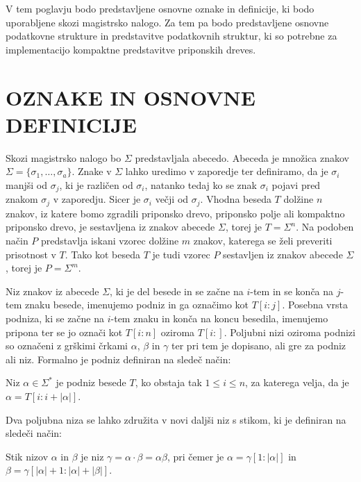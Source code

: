 
V tem poglavju bodo predstavljene osnovne oznake in definicije, ki bodo uporabljene skozi magistrsko nalogo. Za tem pa bodo predstavljene osnovne podatkovne strukture in predstavitve podatkovnih struktur, ki so potrebne za implementacijo kompaktne predstavitve priponskih dreves.


\section{OZNAKE IN OSNOVNE DEFINICIJE}\label{sec:def}
Skozi magistrsko nalogo bo $\Sigma$ predstavljala abecedo. Abeceda je množica znakov $\Sigma=\{\sigma_1,\dots,\sigma_a\}$. Znake v $\Sigma$ lahko uredimo v zaporedje ter definiramo, da je $\sigma_i$ manjši od $\sigma_j$, ki je različen od $\sigma_i$, natanko tedaj ko se znak $\sigma_i$ pojavi pred znakom $\sigma_j$ v zaporedju. Sicer je $\sigma_i$ večji od $\sigma_j$.
Vhodna beseda $T$ dolžine $n$ znakov, iz katere bomo zgradili priponsko drevo, priponsko polje ali kompaktno priponsko drevo, je sestavljena iz znakov abecede $\Sigma$, torej je $T=\Sigma^n$. Na podoben način $P$ predstavlja iskani vzorec dolžine $m$ znakov, katerega se želi preveriti prisotnost v $T$. Tako kot beseda $T$ je tudi vzorec $P$ sestavljen iz znakov abecede $\Sigma$, torej je $P=\Sigma^m$.

Niz znakov iz abecede $\Sigma$, ki je del besede in se začne na $i$-tem in se konča na $j$-tem znaku besede, imenujemo podniz in ga označimo kot $T[i:j]$. Posebna vrsta podniza, ki se začne na $i$-tem znaku in konča na koncu besedila, imenujemo pripona ter se jo označi kot $T[i:n]$ oziroma $T[i:]$. Poljubni nizi oziroma podnizi so označeni z grškimi črkami $\alpha$, $\beta$ in $\gamma$ ter pri tem je dopisano, ali gre za podniz ali niz. Formalno je podniz definiran na sledeč način:
\begin{defi}
    Niz $\alpha\in\Sigma^*$ je podniz besede $T$, ko obstaja tak $1\le i\le n$, za katerega velja, da je  $\alpha=T[i:i+|\alpha|]$. 
\end{defi}
Dva poljubna niza se lahko združita v novi daljši niz s stikom, ki je definiran na sledeči način:
\begin{defi}
    Stik nizov $\alpha$ in $\beta$ je niz $\gamma=\alpha\cdot\beta=\alpha\beta$, pri čemer je $\alpha=\gamma[1:|\alpha|]$ in $\beta=\gamma[|\alpha|+1:|\alpha|+|\beta|]$.
\end{defi}

